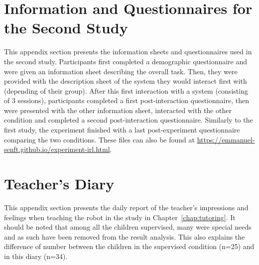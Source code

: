 \cleartooddpage
\chapter{Information and Questionnaires for the Second Study} \label{app:control_questionnaires}
This appendix section presents the information sheets and questionnaires used in the second study. Participants  first completed a demographic questionnaire and were given an information sheet describing the overall task. Then, they were provided with the description sheet of the system they would interact first with (depending of their group). After this first interaction with a system (consisting of 3 sessions), participants completed a first post-interaction questionnaire, then were presented with the other information sheet, interacted with the other condition and completed a second post-interaction questionnaire. Similarly to the first study, the experiment finished with a last post-experiment questionnaire comparing the two conditions. These files can also be found at \url{https://emmanuel-senft.github.io/experiment-irl.html}.

\cleartooddpage
\chapter{Teacher's Diary} \label{app:diary}
This appendix section presents the daily report of the teacher's impressions and feelings when teaching the robot in the study in Chapter~\ref{chap:tutoring}. It should be noted that among all the children supervised, many were special needs and as such have been removed from the result analysis. This also explains the difference of number between the children in the supervised condition (n=25) and in this diary (n=34).


